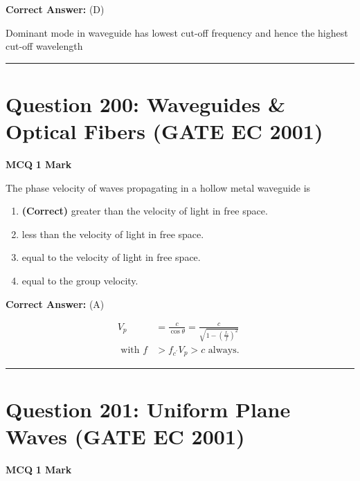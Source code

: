 \documentclass[11pt,a4paper]{article}
\begin{document}
\noindent \textbf{Correct Answer:} (D)

\begin{tcolorbox}[solbox, title=Detailed Solution -- Question 199]
Dominant mode in waveguide has lowest cut-off
frequency and hence the highest cut-off
wavelength
\end{tcolorbox}

\vspace{1.5em}
\hrule
\vspace{1.5em}

\section*{Question 200: Waveguides \& Optical Fibers (GATE EC 2001)}
\noindent \textbf{\color{primary}MCQ} \hfill \textbf{\color{secondary}1 Mark}


\noindent The phase velocity of waves propagating in a hollow metal waveguide is


\begin{enumerate}[label=(\Alph*)]
    \item \textbf{(Correct)} greater than the velocity of light in free space.
    \item less than the velocity of light in free space.
    \item equal to the velocity of light in free space.
    \item equal to the group velocity.
\end{enumerate}

\noindent \textbf{Correct Answer:} (A)

\begin{tcolorbox}[solbox, title=Detailed Solution -- Question 200]
\[
\begin{aligned} V_{p}&=\frac{c}{\cos \theta}=\frac{c}{\sqrt{1-\left(\frac{f_{c}}{f}\right)^{2}}} \\ \text { with } f& > f_{c^{\prime}} V_{p} > c \text { always. } \end{aligned}
\]
\end{tcolorbox}

\vspace{1.5em}
\hrule
\vspace{1.5em}

\section*{Question 201: Uniform Plane Waves (GATE EC 2001)}
\noindent \textbf{\color{primary}MCQ} \hfill \textbf{\color{secondary}1 Mark}
\end{document}
